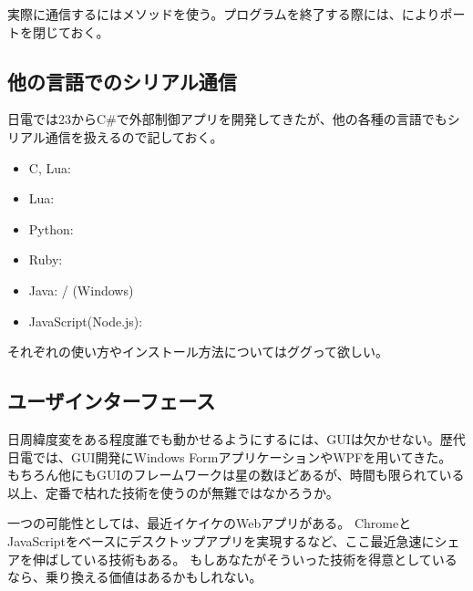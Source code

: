\documentclass[letterpaper,10pt,dvipdfmx]{sphinxmanual}
\begin{document}
実際に通信するにはメソッドを使う。プログラムを終了する際には、によりポートを閉じておく。


\subsection{他の言語でのシリアル通信}
\label{\detokenize{nissyu-idohen/pc-software:}}\label{\detokenize{nissyu-idohen/pc-software:id7}}
日電では23からC\#で外部制御アプリを開発してきたが、他の各種の言語でもシリアル通信を扱えるので記しておく。
\begin{itemize}
\item {} 
C, Lua: \href{https://github.com/ynezz/librs232/}{}

\item {} 
Lua: 

\item {} 
Python: \href{http://pyserial.sourceforge.net/}{}

\item {} 
Ruby: \href{http://ruby-serialport.rubyforge.org/}{}

\item {} 
Java:  / (Windows)

\item {} 
JavaScript(Node.js): \href{https://www.npmjs.com/package/serialport}{}

\end{itemize}

それぞれの使い方やインストール方法についてはググって欲しい。


\subsection{ユーザインターフェース}
\label{\detokenize{nissyu-idohen/pc-software:}}\label{\detokenize{nissyu-idohen/pc-software:id8}}
日周緯度変をある程度誰でも動かせるようにするには、GUIは欠かせない。歴代日電では、GUI開発にWindows FormアプリケーションやWPFを用いてきた。
もちろん他にもGUIのフレームワークは星の数ほどあるが、時間も限られている以上、定番で枯れた技術を使うのが無難ではなかろうか。

一つの可能性としては、最近イケイケのWebアプリがある。
ChromeとJavaScriptをベースにデスクトップアプリを実現するなど、ここ最近急速にシェアを伸ばしている技術もある。
もしあなたがそういった技術を得意としているなら、乗り換える価値はあるかもしれない。
\end{document}

